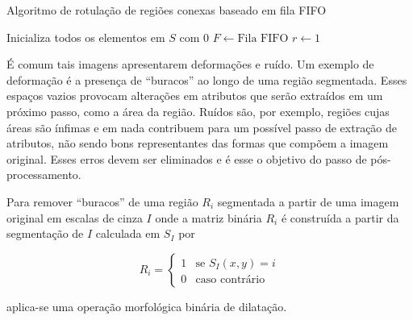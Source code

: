 \begin{espacosimples}
\begin{algorithm2e}[H]
  \caption{Algoritmo de rotulação de regiões conexas baseado em fila FIFO}
  \label{algo:conexo}
  \SetAlgoLined

  Inicializa todos os elementos em $S$ com $0$\;
  $F \gets \text{Fila FIFO}$\;
  $r \gets 1$\;


\end{algorithm2e}
\end{espacosimples}

\vspace{1.0cm}

É comum tais imagens apresentarem deformações e ruído. Um exemplo de
deformação é a presença de ``buracos'' ao longo de uma região
segmentada. Esses espaços vazios provocam alterações em atributos que
serão extraídos em um próximo passo, como a área da região. Ruídos
são, por exemplo, regiões cujas áreas são ínfimas e em nada contribuem
para um possível passo de extração de atributos, não sendo bons
representantes das formas que compõem a imagem original. Esses erros
devem ser eliminados e é esse o objetivo do passo de
pós-processamento.

Para remover ``buracos'' de uma região $R_i$ segmentada a partir de
uma imagem original em escalas de cinza $I$ onde a matriz binária
$R_i$ é construída a partir da segmentação de $I$ calculada em $S_I$ por

\begin{equation}
  R_i = 
  \begin{cases}
    1 & \text{se $S_I(x,y) = i$} \\
    0 & \text{caso contrário}
  \end{cases}
\end{equation}

\noindent aplica-se uma operação morfológica binária de dilatação.


